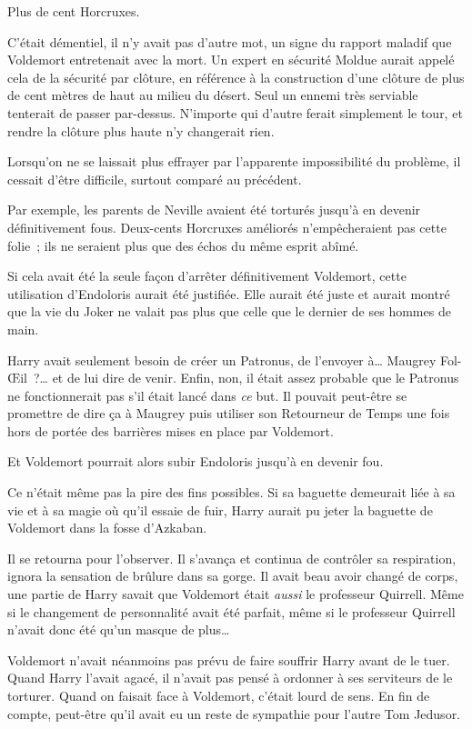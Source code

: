 Plus de cent Horcruxes.

C'était démentiel, il n'y avait pas d'autre mot, un signe du rapport maladif que Voldemort entretenait avec la mort. Un expert en sécurité Moldue aurait appelé cela de la sécurité par clôture, en référence à la construction d'une clôture de plus de cent mètres de haut au milieu du désert. Seul un ennemi très serviable tenterait de passer par-dessus. N'importe qui d'autre ferait simplement le tour, et rendre la clôture plus haute n'y changerait rien.

Lorsqu'on ne se laissait plus effrayer par l'apparente impossibilité du problème, il cessait d'être difficile, surtout comparé au précédent.

Par exemple, les parents de Neville avaient été torturés jusqu'à en devenir définitivement fous. Deux-cents Horcruxes améliorés n'empêcheraient pas cette folie~; ils ne seraient plus que des échos du même esprit abîmé.

Si cela avait été la seule façon d'arrêter définitivement Voldemort, cette utilisation d'Endoloris aurait été justifiée. Elle aurait été juste et aurait montré que la vie du Joker ne valait pas plus que celle que le dernier de ses hommes de main.

Harry avait seulement besoin de créer un Patronus, de l'envoyer à… Maugrey Fol-Œil~?… et de lui dire de venir. Enfin, non, il était assez probable que le Patronus ne fonctionnerait pas s'il était lancé dans \emph{ce} but. Il pouvait peut-être se promettre de dire ça à Maugrey puis utiliser son Retourneur de Temps une fois hors de portée des barrières mises en place par Voldemort.

Et Voldemort pourrait alors subir Endoloris jusqu'à en devenir fou.

Ce n'était même pas la pire des fins possibles. Si sa baguette demeurait liée à sa vie et à sa magie où qu'il essaie de fuir, Harry aurait pu jeter la baguette de Voldemort dans la fosse d'Azkaban.

Il se retourna pour l'observer. Il s'avança et continua de contrôler sa respiration, ignora la sensation de brûlure dans sa gorge. Il avait beau avoir changé de corps, une partie de Harry savait que Voldemort était \emph{aussi} le professeur Quirrell. Même si le changement de personnalité avait été parfait, même si le professeur Quirrell n'avait donc été qu'un masque de plus…

Voldemort n'avait néanmoins pas prévu de faire souffrir Harry avant de le tuer. Quand Harry l'avait agacé, il n'avait pas pensé à ordonner à ses serviteurs de le torturer. Quand on faisait face à Voldemort, c'était lourd de sens. En fin de compte, peut-être qu'il avait eu un reste de sympathie pour l'autre Tom Jedusor.

